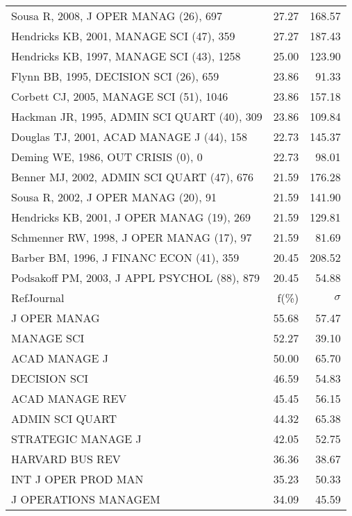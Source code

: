 \documentclass[a4paper,11pt]{report}
\begin{document}
\begin{landscape}
\begin{table}[!ht]
{\begin{tabular}{|l r r|}
Sousa R, 2008, J OPER MANAG (26), 697 & 27.27 & 168.57\\
Hendricks KB, 2001, MANAGE SCI (47), 359 & 27.27 & 187.43\\
Hendricks KB, 1997, MANAGE SCI (43), 1258 & 25.00 & 123.90\\
Flynn BB, 1995, DECISION SCI (26), 659 & 23.86 & 91.33\\
Corbett CJ, 2005, MANAGE SCI (51), 1046 & 23.86 & 157.18\\
Hackman JR, 1995, ADMIN SCI QUART (40), 309 & 23.86 & 109.84\\
Douglas TJ, 2001, ACAD MANAGE J (44), 158 & 22.73 & 145.37\\
Deming WE, 1986, OUT CRISIS (0), 0 & 22.73 & 98.01\\
Benner MJ, 2002, ADMIN SCI QUART (47), 676 & 21.59 & 176.28\\
Sousa R, 2002, J OPER MANAG (20), 91 & 21.59 & 141.90\\
Hendricks KB, 2001, J OPER MANAG (19), 269 & 21.59 & 129.81\\
Schmenner RW, 1998, J OPER MANAG (17), 97 & 21.59 & 81.69\\
Barber BM, 1996, J FINANC ECON (41), 359 & 20.45 & 208.52\\
Podsakoff PM, 2003, J APPL PSYCHOL (88), 879 & 20.45 & 54.88\\
\hline
\hline
RefJournal & f(\%) & $\sigma$\\
\hline
J OPER MANAG & 55.68 & 57.47\\
MANAGE SCI & 52.27 & 39.10\\
ACAD MANAGE J & 50.00 & 65.70\\
DECISION SCI & 46.59 & 54.83\\
ACAD MANAGE REV & 45.45 & 56.15\\
ADMIN SCI QUART & 44.32 & 65.38\\
STRATEGIC MANAGE J & 42.05 & 52.75\\
HARVARD BUS REV & 36.36 & 38.67\\
INT J OPER PROD MAN & 35.23 & 50.33\\
J OPERATIONS MANAGEM & 34.09 & 45.59\\
\hline
\end{tabular}
}
\end{table}

\end{landscape}
\end{document}
